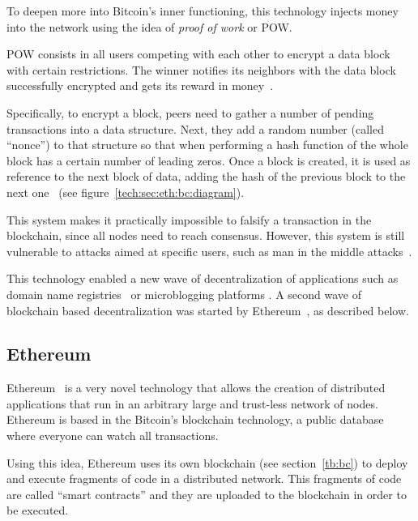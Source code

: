 To deepen more into Bitcoin's inner functioning, this technology injects money
into the network using the idea of \emph{proof of work} or POW.

POW consists in all users competing with each other to encrypt a data block with
certain restrictions. The winner notifies its neighbors with the data block
successfully encrypted and gets its reward in money~\cite{barber2012bitter}.

Specifically, to encrypt a block, peers need to gather a number of pending
transactions into a data structure. Next, they add a random number (called
``nonce'') to that structure so that when performing a hash function of the
whole block has a certain number of leading zeros. Once a block is created, it
is used as reference to the next block of data, adding the hash of the previous
block to the next one~\cite{antonopoulos2014mastering} (see
figure~\ref{tech:sec:eth:bc:diagram}).


This system makes it practically impossible to falsify a transaction in the
blockchain, since all nodes need to reach consensus. However, this system is
still vulnerable to attacks aimed at specific users, such as man in the middle
attacks~\cite{moore2013beware}.

This technology enabled a new wave of decentralization of applications such as
domain name registries~\cite{benshoof2016distributed} or microblogging platforms
\cite{freitas2013twister}. A second wave of blockchain based decentralization
was started by Ethereum~\cite{buterin2014ethereum}, as described below.

\subsection{Ethereum}
\label{tb:eth}
Ethereum~\cite{buterin2014ethereum} is a very novel technology that allows the
creation of distributed applications that run in an arbitrary large and
trust-less network of nodes. Ethereum is based in the Bitcoin's blockchain
technology, a public database where everyone can watch all transactions.

Using this idea, Ethereum uses its own blockchain (see section~\ref{tb:bc}) to
deploy and execute fragments of code in a distributed network. This fragments of
code are called ``smart contracts'' and they are uploaded to the blockchain in
order to be executed.


